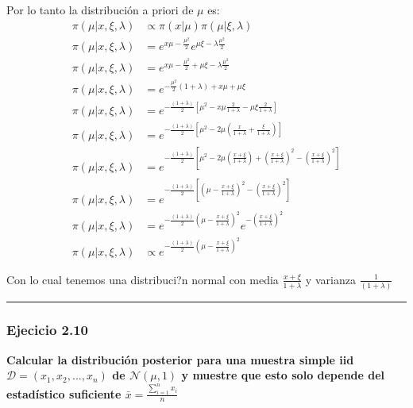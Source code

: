 \documentclass[12pt,]{article}
\begin{document}
Por lo tanto la distribución a priori de \(\mu\) es: \[
\begin{array}{rl}
\pi(\mu|x,\xi,\lambda) & \propto \pi(x|\mu)\pi(\mu|\xi,\lambda)\\
\pi(\mu|x,\xi,\lambda) & = e^{x\mu-\frac{\mu^2}{2}}e^{\mu\xi-\lambda\frac{\mu^2}{2}}\\
\pi(\mu|x,\xi,\lambda) & = e^{x\mu-\frac{\mu^2}{2}+\mu\xi-\lambda\frac{\mu^2}{2}}\\
\pi(\mu|x,\xi,\lambda) & = e^{-\frac{\mu^2}{2}(1+\lambda)+ x\mu +\mu\xi}\\
\pi(\mu|x,\xi,\lambda) & = e^{-\frac{(1+\lambda)}{2}[\mu^2- x\mu\frac{2}{1+\lambda} -\mu\xi\frac{2}{1+\lambda}]}\\
\pi(\mu|x,\xi,\lambda) & = e^{-\frac{(1+\lambda)}{2}[\mu^2- 2\mu(\frac{x}{1+\lambda} + \frac{\xi}{1+\lambda})]}\\
\pi(\mu|x,\xi,\lambda) & = e^{-\frac{(1+\lambda)}{2}[\mu^2- 2\mu(\frac{x+\xi}{1+\lambda})+ (\frac{x+\xi}{1+\lambda})^2- (\frac{x+\xi}{1+\lambda})^2]}\\
\pi(\mu|x,\xi,\lambda) & = e^{-\frac{(1+\lambda)}{2}[(\mu- \frac{x+\xi}{1+\lambda})^2- (\frac{x+\xi}{1+\lambda})^2]}\\
\pi(\mu|x,\xi,\lambda) & = e^{-\frac{(1+\lambda)}{2}(\mu- \frac{x+\xi}{1+\lambda})^2}e^{- (\frac{x+\xi}{1+\lambda})^2}\\
\pi(\mu|x,\xi,\lambda) & \propto e^{-\frac{(1+\lambda)}{2}(\mu- \frac{x+\xi}{1+\lambda})^2}
\end{array}
\]

Con lo cual tenemos una distribuci?n normal con media
\(\frac{x+\xi}{1+\lambda}\) y varianza \(\frac{1}{(1+\lambda)}\)

\begin{center}\rule{0.5\linewidth}{\linethickness}\end{center}

\subsubsection{Ejecicio 2.10}\label{ejecicio-2.10}

\textbf{Calcular la distribución posterior para una muestra simple iid
\(\mathcal{D}=(x_1,x_2,...,x_n)\) de \(\mathcal{N}(\mu,1)\) y muestre
que esto solo depende del estadístico suficiente
\(\bar{x}=\frac{\sum_{i=1}^n x_{i}}{n}\)}
\end{document}
